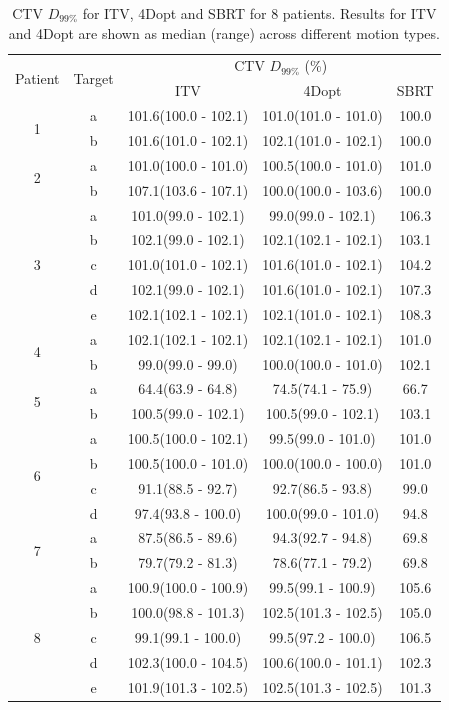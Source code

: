 \documentclass[type=dr, dr=rernat, accentcolor=tud7b,colorbacktitle, bigchapter, openright, twoside, 12pt ]{tudthesis}
\begin{document}
\begin{table}[H]
	\centering
	\caption{CTV $D_{99\%}$ for ITV, 4Dopt and SBRT for 8 patients. Results for ITV and 4Dopt are shown as median (range) across different motion types.}
	\begin{tabular}{c|c|c|c|c}
		\hline\hline
		\multirow{2}{*}{Patient} & \multirow{2}{*}{Target} & \multicolumn{3}{|c}{CTV $D_{99\%}$ (\%)}  \\
		 &  & ITV & 4Dopt & SBRT \\
		 \hline
		 
\multirow{2}{*}{1} & a & 101.6(100.0 - 102.1) & 101.0(101.0 - 101.0) & 100.0\\ 
 & b & 101.6(101.0 - 102.1) & 102.1(101.0 - 102.1) & 100.0\\ 
 \hline
\multirow{2}{*}{2} & a & 101.0(100.0 - 101.0) & 100.5(100.0 - 101.0) & 101.0\\ 
 & b & 107.1(103.6 - 107.1) & 100.0(100.0 - 103.6) & 100.0\\ 
 \hline
\multirow{5}{*}{3} & a & 101.0(99.0 - 102.1) & 99.0(99.0 - 102.1) & 106.3\\ 
 & b & 102.1(99.0 - 102.1) & 102.1(102.1 - 102.1) & 103.1\\ 
 & c & 101.0(101.0 - 102.1) & 101.6(101.0 - 102.1) & 104.2\\ 
 & d & 102.1(99.0 - 102.1) & 101.6(101.0 - 102.1) & 107.3\\ 
 & e & 102.1(102.1 - 102.1) & 102.1(101.0 - 102.1) & 108.3\\ 
 \hline
\multirow{2}{*}{4} & a & 102.1(102.1 - 102.1) & 102.1(102.1 - 102.1) & 101.0\\ 
 & b & 99.0(99.0 - 99.0) & 100.0(100.0 - 101.0) & 102.1\\ 
 \hline
\multirow{2}{*}{5} & a & 64.4(63.9 - 64.8) & 74.5(74.1 - 75.9) & 66.7\\ 
 & b & 100.5(99.0 - 102.1) & 100.5(99.0 - 102.1) & 103.1\\ 
 \hline
\multirow{4}{*}{6} & a & 100.5(100.0 - 102.1) & 99.5(99.0 - 101.0) & 101.0\\ 
 & b & 100.5(100.0 - 101.0) & 100.0(100.0 - 100.0) & 101.0\\ 
 & c & 91.1(88.5 - 92.7) & 92.7(86.5 - 93.8) & 99.0\\ 
 & d & 97.4(93.8 - 100.0) & 100.0(99.0 - 101.0) & 94.8\\ 
 \hline
\multirow{2}{*}{7} & a & 87.5(86.5 - 89.6) & 94.3(92.7 - 94.8) & 69.8\\ 
 & b & 79.7(79.2 - 81.3) & 78.6(77.1 - 79.2) & 69.8\\ 
 \hline
\multirow{5}{*}{8} & a & 100.9(100.0 - 100.9) & 99.5(99.1 - 100.9) & 105.6\\ 
 & b & 100.0(98.8 - 101.3) & 102.5(101.3 - 102.5) & 105.0\\ 
 & c & 99.1(99.1 - 100.0) & 99.5(97.2 - 100.0) & 106.5\\ 
 & d & 102.3(100.0 - 104.5) & 100.6(100.0 - 101.1) & 102.3\\ 
 & e & 101.9(101.3 - 102.5) & 102.5(101.3 - 102.5) & 101.3\\ 
\hline\hline
	\end{tabular}
	\label{tab:resultsComplex}
\end{table}
\end{document}
